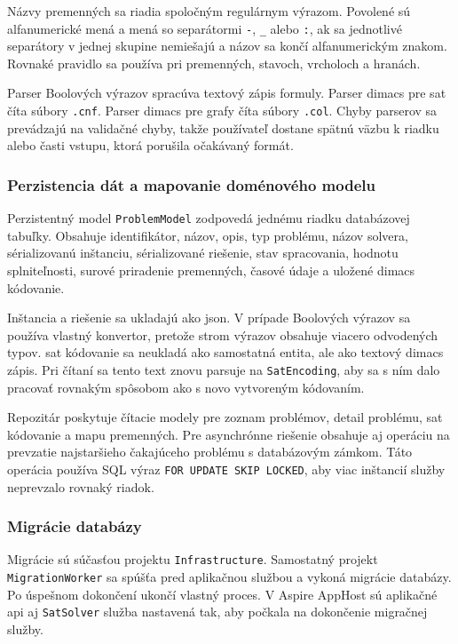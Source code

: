 Názvy premenných sa riadia spoločným regulárnym výrazom. Povolené sú alfanumerické mená a mená so separátormi \texttt{-}, \texttt{\_} alebo \texttt{:}, ak sa jednotlivé separátory v jednej skupine nemiešajú a názov sa končí alfanumerickým znakom. Rovnaké pravidlo sa používa pri premenných, stavoch, vrcholoch a hranách.

Parser Boolových výrazov spracúva textový zápis formuly. Parser \acrshort{dimacs} pre \acrshort{sat} číta súbory \texttt{.cnf}. Parser \acrshort{dimacs} pre grafy číta súbory \texttt{.col}. Chyby parserov sa prevádzajú na validačné chyby, takže používateľ dostane spätnú väzbu k riadku alebo časti vstupu, ktorá porušila očakávaný formát.

\subsubsection{Perzistencia dát a mapovanie doménového modelu}\label{sec:implementation:persistence}
Perzistentný model \texttt{ProblemModel} zodpovedá jednému riadku databázovej tabuľky. Obsahuje identifikátor, názov, opis, typ problému, názov solvera, sérializovanú inštanciu, sérializované riešenie, stav spracovania, hodnotu splniteľnosti, surové priradenie premenných, časové údaje a uložené \acrshort{dimacs} kódovanie.

Inštancia a riešenie sa ukladajú ako \acrshort{json}. V prípade Boolových výrazov sa používa vlastný konvertor, pretože strom výrazov obsahuje viacero odvodených typov. \acrshort{sat} kódovanie sa neukladá ako samostatná entita, ale ako textový \acrshort{dimacs} zápis. Pri čítaní sa tento text znovu parsuje na \texttt{SatEncoding}, aby sa s ním dalo pracovať rovnakým spôsobom ako s novo vytvoreným kódovaním.

Repozitár poskytuje čítacie modely pre zoznam problémov, detail problému, \acrshort{sat} kódovanie a mapu premenných. Pre asynchrónne riešenie obsahuje aj operáciu na prevzatie najstaršieho čakajúceho problému s databázovým zámkom. Táto operácia používa SQL výraz \texttt{FOR UPDATE SKIP LOCKED}, aby viac inštancií služby neprevzalo rovnaký riadok.

\subsubsection{Migrácie databázy}\label{sec:implementation:database-migrations}
Migrácie sú súčasťou projektu \texttt{Infrastructure}. Samostatný projekt \texttt{MigrationWorker} sa spúšťa pred aplikačnou službou a vykoná migrácie databázy. Po úspešnom dokončení ukončí vlastný proces. V Aspire AppHost sú aplikačné \acrshort{api} aj \texttt{SatSolver} služba nastavená tak, aby počkala na dokončenie migračnej služby.

